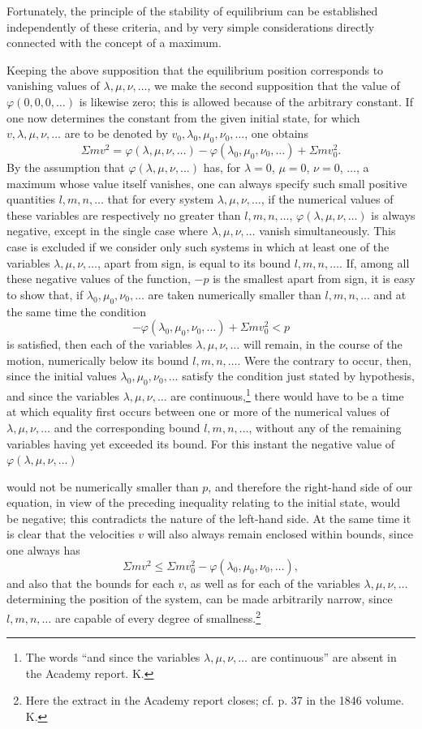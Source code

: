 \documentclass[11pt]{article}
\begin{document}
Fortunately, the principle of the stability of equilibrium can be established independently of these criteria, and by very simple considerations directly connected with the concept of a maximum.

Keeping the above supposition that the equilibrium position corresponds to vanishing values of $\lambda,\mu,\nu,\ldots$, we make the second supposition that the value of $\varphi(0,0,0,\ldots)$ is likewise zero; this is allowed because of the arbitrary constant. If one now determines the constant from the given initial state, for which $v,\lambda,\mu,\nu,\ldots$ are to be denoted by $v_0,\lambda_0,\mu_0,\nu_0,\ldots$, one obtains
\[
\Sigma m v^2 = \varphi(\lambda,\mu,\nu,\ldots)-\varphi(\lambda_0,\mu_0,\nu_0,\ldots)+\Sigma m v_0^2.
\]
By the assumption that $\varphi(\lambda,\mu,\nu,\ldots)$ has, for $\lambda=0$, $\mu=0$, $\nu=0$, $\ldots$, a maximum whose value itself vanishes, one can always specify such small positive quantities $l,m,n,\ldots$ that for every system $\lambda,\mu,\nu,\ldots$, if the numerical values of these variables are respectively no greater than $l,m,n,\ldots$, $\varphi(\lambda,\mu,\nu,\ldots)$ is always negative, except in the single case where $\lambda,\mu,\nu,\ldots$ vanish simultaneously. This case is excluded if we consider only such systems in which at least one of the variables $\lambda,\mu,\nu,\ldots$, apart from sign, is equal to its bound $l,m,n,\ldots$. If, among all these negative values of the function, $-p$ is the smallest apart from sign, it is easy to show that, if $\lambda_0,\mu_0,\nu_0,\ldots$ are taken numerically smaller than $l,m,n,\ldots$ and at the same time the condition
\[
-\varphi(\lambda_0,\mu_0,\nu_0,\ldots)+\Sigma m v_0^2<p
\]
is satisfied, then each of the variables $\lambda,\mu,\nu,\ldots$ will remain, in the course of the motion, numerically below its bound $l,m,n,\ldots$. Were the contrary to occur, then, since the initial values $\lambda_0,\mu_0,\nu_0,\ldots$ satisfy the condition just stated by hypothesis, and since the variables $\lambda,\mu,\nu,\ldots$ are continuous,\footnote{The words ``and since the variables $\lambda,\mu,\nu,\ldots$ are continuous'' are absent in the Academy report. K.} there would have to be a time at which equality first occurs between one or more of the numerical values of $\lambda,\mu,\nu,\ldots$ and the corresponding bound $l,m,n,\ldots$, without any of the remaining variables having yet exceeded its bound. For this instant the negative value of $\varphi(\lambda,\mu,\nu,\ldots)$

\noindent would not be numerically smaller than $p$, and therefore the right-hand side of our equation, in view of the preceding inequality relating to the initial state, would be negative; this contradicts the nature of the left-hand side. At the same time it is clear that the velocities $v$ will also always remain enclosed within bounds, since one always has
\[
\Sigma m v^2 \leq \Sigma m v_0^2-\varphi(\lambda_0,\mu_0,\nu_0,\ldots),
\]
and also that the bounds for each $v$, as well as for each of the variables $\lambda,\mu,\nu,\ldots$ determining the position of the system, can be made arbitrarily narrow, since $l,m,n,\ldots$ are capable of every degree of smallness.\footnote{Here the extract in the Academy report closes; cf. p. 37 in the 1846 volume. K.}
\end{document}
